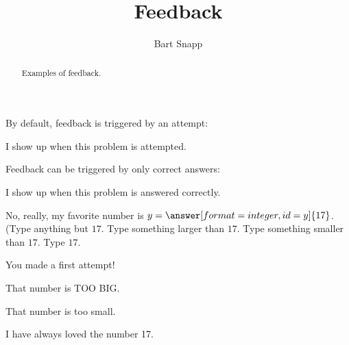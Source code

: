 \documentclass{ximera}
\title[Examples:]{Feedback}
\author{Bart Snapp}
\begin{document}
\begin{abstract}
  Examples of feedback.
\end{abstract}
\maketitle

By default, feedback is triggered by an attempt:
\begin{exercise}
  \begin{multipleChoice}
  \end{multipleChoice}
  \begin{feedback}
    I show up when this problem is attempted. 
  \end{feedback}
\end{exercise}


Feedback can be triggered by only correct answers:
\begin{exercise}
  \begin{multipleChoice}
  \end{multipleChoice}
  \begin{feedback}[correct]
    I show up when this problem is answered correctly.
  \end{feedback}
\end{exercise}

\begin{problem}
  No, really, my favorite number is $y = \answer[format=integer,id=y]{17}$.
 (Type anything but $17$. Type something larger than $17$. Type something smaller than $17$. Type $17$.
  \begin{feedback}[attempt]
    You made a first attempt!
  \end{feedback}

  \begin{feedback}[y>17]
    That number is TOO BIG.
  \end{feedback}

  \begin{feedback}[y<17]
    That number is too small.
  \end{feedback}

  \begin{feedback}[correct]
    I have always loved the number 17.
  \end{feedback}
\end{problem}
\end{document}

